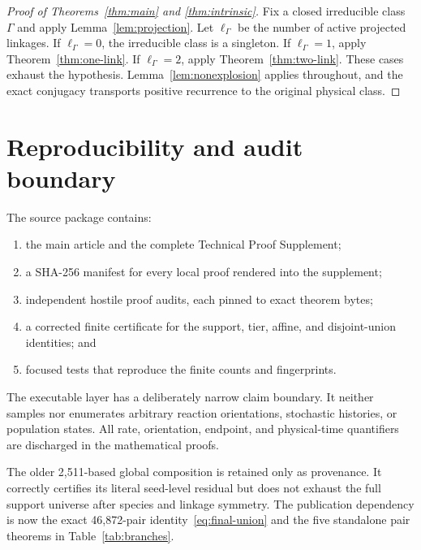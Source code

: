 \documentclass[11pt]{article}
\theoremstyle{definition}
\theoremstyle{remark}
\newcommand{\1}{\mathbf 1}
\begin{document}
\begin{proof}[Proof of Theorems~\ref{thm:main} and \ref{thm:intrinsic}]
Fix a closed irreducible class $\Gamma$ and apply
Lemma~\ref{lem:projection}.  Let $\ell_\Gamma$ be the number of active
projected linkages.  If $\ell_\Gamma=0$, the irreducible class is a singleton.
If $\ell_\Gamma=1$, apply Theorem~\ref{thm:one-link}.  If
$\ell_\Gamma=2$, apply Theorem~\ref{thm:two-link}.  These cases exhaust the
hypothesis.  Lemma~\ref{lem:nonexplosion} applies throughout, and the exact
conjugacy transports positive recurrence to the original physical class.
\end{proof}

\section{Reproducibility and audit boundary}

The source package contains:
\begin{enumerate}[label=(\roman*)]
\item the main article and the complete Technical Proof Supplement;
\item a SHA-256 manifest for every local proof rendered into the supplement;
\item independent hostile proof audits, each pinned to exact theorem bytes;
\item a corrected finite certificate for the support, tier, affine, and
      disjoint-union identities; and
\item focused tests that reproduce the finite counts and fingerprints.
\end{enumerate}

The executable layer has a deliberately narrow claim boundary.  It neither
samples nor enumerates arbitrary reaction orientations, stochastic histories,
or population states.  All rate, orientation, endpoint, and physical-time
quantifiers are discharged in the mathematical proofs.

The older 2,511-based global composition is retained only as provenance.  It
correctly certifies its literal seed-level residual but does not exhaust the
full support universe after species and linkage symmetry.  The publication
dependency is now the exact 46,872-pair identity~\eqref{eq:final-union} and
the five standalone pair theorems in Table~\ref{tab:branches}.
\end{document}
